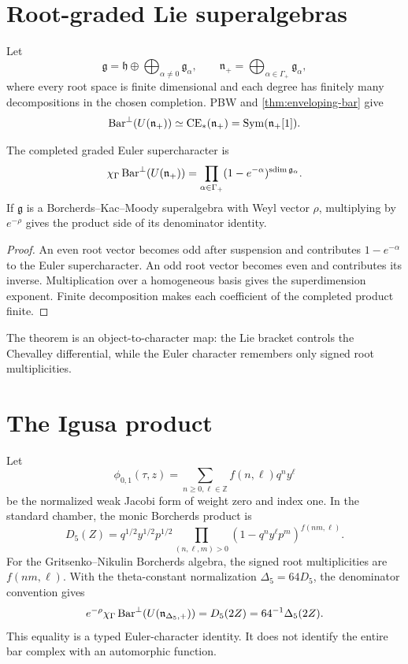 \section{Root-graded Lie superalgebras}
Let
\[
 \mathfrak g=\mathfrak h\oplus\bigoplus_{\alpha\ne0}\mathfrak g_\alpha,
 \qquad
 \mathfrak n_+=\bigoplus_{\alpha\in\Gamma_+}\mathfrak g_\alpha,
\]
where every root space is finite dimensional and each degree has finitely many decompositions in the chosen completion.  PBW and \cref{thm:enveloping-bar} give
\[
 \operatorname{Bar}^\perp(U(\mathfrak n_+))\simeq\operatorname{CE}_*(\mathfrak n_+)
 =\operatorname{Sym}(\mathfrak n_+[1]).
\]

\begin{theorem}\label{thm:bar-denominator}
The completed graded Euler supercharacter is
\[
 \chi_\Gamma\operatorname{Bar}^\perp(U(\mathfrak n_+))
 =\prod_{\alpha\in\Gamma_+}
 (1-e^{-\alpha})^{\operatorname{sdim}\mathfrak g_\alpha}.
\]
If \(\mathfrak g\) is a Borcherds--Kac--Moody superalgebra with Weyl vector \(\rho\), multiplying by \(e^{-\rho}\) gives the product side of its denominator identity.
\end{theorem}
\begin{proof}
An even root vector becomes odd after suspension and contributes \(1-e^{-\alpha}\) to the Euler supercharacter.  An odd root vector becomes even and contributes its inverse.  Multiplication over a homogeneous basis gives the superdimension exponent.  Finite decomposition makes each coefficient of the completed product finite.
\end{proof}

The theorem is an object-to-character map: the Lie bracket controls the Chevalley differential, while the Euler character remembers only signed root multiplicities.

\section{The Igusa product}
Let
\[
 \phi_{0,1}(\tau,z)=\sum_{n\ge0,\ell\in\mathbb Z}f(n,\ell)q^ny^\ell
\]
be the normalized weak Jacobi form of weight zero and index one.  In the standard chamber, the monic Borcherds product is
\[
 D_5(Z)=q^{1/2}y^{1/2}p^{1/2}
 \prod_{(n,\ell,m)>0}
 (1-q^ny^\ell p^m)^{f(nm,\ell)}.
\]
For the Gritsenko--Nikulin Borcherds algebra, the signed root multiplicities are \(f(nm,\ell)\).  With the theta-constant normalization \(\Delta_5=64D_5\), the denominator convention gives
\[
 e^{-\rho}\chi_\Gamma\operatorname{Bar}^\perp(U(\mathfrak n_{\Delta_5,+}))
 =D_5(2Z)=64^{-1}\Delta_5(2Z).
\]
This equality is a typed Euler-character identity.  It does not identify the entire bar complex with an automorphic function.

